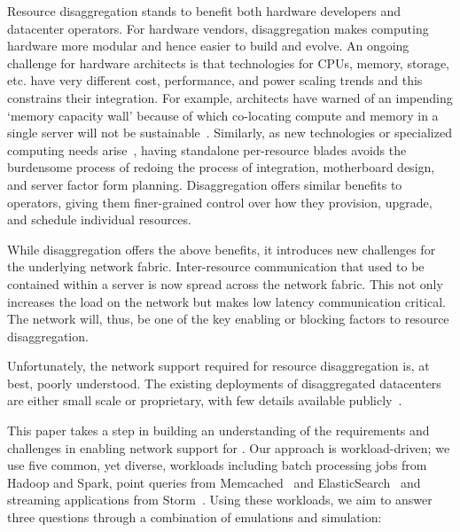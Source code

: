 Resource disaggregation stands to benefit both hardware developers and datacenter operators. %
For hardware vendors, disaggregation makes computing hardware more modular and hence 
easier to build and evolve. 
An ongoing challenge for hardware architects is that technologies for CPUs, memory, storage, etc. have very different cost, performance, and power scaling trends and this constrains their integration. For example, architects have warned of an impending `memory capacity wall' because of which co-locating compute and memory in a single server will not be sustainable~\cite{ddcHwDesign1}. 
Similarly, as new technologies or specialized computing needs arise~\cite{memristors,nvram,reg-ex-hardware,gpus}, having standalone per-resource blades avoids the burdensome process of redoing the process of integration, motherboard design, and server factor form planning. Disaggregation offers similar benefits to operators, giving them finer-grained control over how they  provision, upgrade, and schedule individual resources.

While disaggregation offers the above benefits, it introduces new challenges for the underlying network fabric. Inter-resource communication that used to be contained within a server is now spread across the network fabric. This not only increases the load on the network but makes low latency communication critical. The network will, thus, be one of the key enabling or blocking factors to resource disaggregation. 

Unfortunately, the network support required for resource disaggregation is, at best, poorly understood. The existing deployments of disaggregated datacenters are either small scale or proprietary, with few details available publicly~\cite{rsa, hptm, fdr, seamicro}.

This paper takes a step in building an understanding of the requirements and challenges in enabling network support for \dis. Our approach is workload-driven; we use five common, yet diverse, workloads including batch processing jobs from Hadoop and Spark, point queries from Memcached~\cite{memcached} and ElasticSearch~\cite{elastic} and streaming applications from Storm~\cite{storm}. Using these workloads, we aim to answer three questions through a combination of emulations and simulation: 

